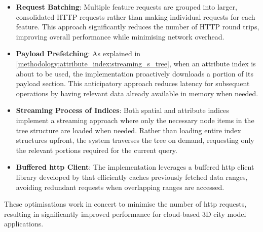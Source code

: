 \begin{itemize}
  \item \textbf{Request Batching}: Multiple feature requests are grouped into larger, consolidated HTTP requests rather than making individual requests for each feature. This approach significantly reduces the number of HTTP round trips, improving overall performance while minimising network overhead.
  \item \textbf{Payload Prefetching}: As explained in \autoref{methodology:attribute_index:streaming_s_tree}, when an attribute index is about to be used, the implementation proactively downloads a portion of its payload section. This anticipatory approach reduces latency for subsequent operations by having relevant data already available in memory when needed.

  \item \textbf{Streaming Process of Indices}: Both spatial and attribute indices implement a streaming approach where only the necessary node items in the tree structure are loaded when needed. Rather than loading entire index structures upfront, the system traverses the tree on demand, requesting only the relevant portions required for the current query.

  \item \textbf{Buffered \ac{http} Client}: The implementation leverages a buffered \ac{http} client library developed by \citet{buffered_http_range_client} that efficiently caches previously fetched data ranges, avoiding redundant requests when overlapping ranges are accessed.

\end{itemize}

These optimisations work in concert to minimise the number of \ac{http} requests, resulting in significantly improved performance for cloud-based 3D city model applications.

